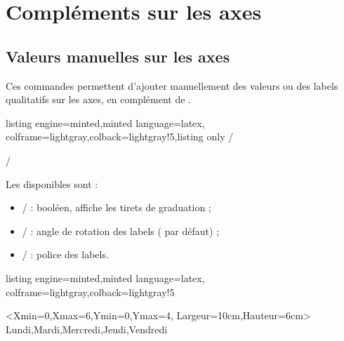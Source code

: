 \documentclass[11pt,a4paper]{ltxdoc}
\begin{document}
\pagebreak

\section{Compléments sur les axes}

\subsection{Valeurs manuelles sur les axes}

Ces commandes permettent d'ajouter manuellement des valeurs ou des labels qualitatifs sur les axes, en complément de .

\begin{tcblisting}{listing engine=minted,minted language=latex,
  colframe=lightgray,colback=lightgray!5,listing only}
\tkzGrphAjouterValeursX / \tkzGrphAjouterValeursY

\tkzGrphAjouterLabelsX / \tkzGrphAjouterLabelsY
\end{tcblisting}

Les \MontreCode{[clés]} disponibles sont :

\begin{itemize}
  \item {} /  : booléen, affiche les tirets de graduation ;
  \item {} /  : angle de rotation des labels ( par défaut) ;
  \item {} /  : police des labels.
\end{itemize}

\begin{tcblisting}{listing engine=minted,minted language=latex,
  colframe=lightgray,colback=lightgray!5}
\begin{tkzGrph}<Xmin=0,Xmax=6,Ymin=0,Ymax=4,
               Largeur=10cm,Hauteur=6cm>
  \tkzGrphDrawGridAxis[Grads=false,enlarge=2.5mm]{}{}
    {Lundi,Mardi,Mercredi,Jeudi,Vendredi}
\end{tkzGrph}
\end{tcblisting}
\end{document}
